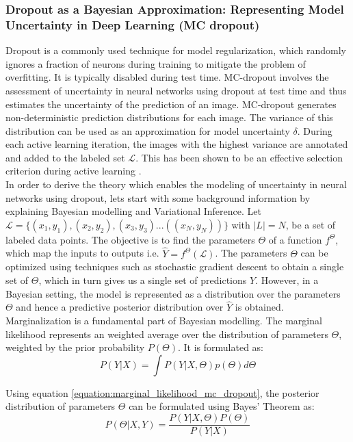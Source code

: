 \subsubsection{Dropout as a Bayesian Approximation: Representing Model Uncertainty in Deep Learning\cite{gal2016, gal2016phd} (MC dropout)}
Dropout\cite{srivastava2014} is a commonly used technique for model regularization, which randomly ignores a fraction of neurons during training to mitigate the problem of overfitting. It is typically disabled during test time. MC-dropout involves the assessment of uncertainty in neural networks using dropout at test time \cite{gal2016, gal2016phd} and thus estimates the uncertainty of the prediction of an image. MC-dropout generates non-deterministic prediction distributions for each image. The variance of this distribution can be used as an approximation for model uncertainty $\delta$. During each active learning iteration, the images with the highest variance are annotated and added to the labeled set $\mathcal{L}$. This has been shown to be an effective selection criterion during active learning \cite{gal2016}. \\
In order to derive the theory which enables the modeling of uncertainty in neural networks using dropout, lets start with some background information by explaining Bayesian modelling and Variational Inference. Let $\mathcal{L} = \{(x_1, y_1), (x_2, y_2), (x_3, y_3) ... ((x_N, y_N))\}$ with $|L| = N$, be a set of labeled data points. The objective is to find the parameters $\Theta$ of a function $f^\Theta$, which map the inputs to outputs i.e. $\hat{Y} = f^\Theta(\mathcal{L})$. The parameters $\Theta$ can be optimized using techniques such as stochastic gradient descent to obtain a single set of $\Theta$, which in turn gives us a single set of predictions $\hat{Y}$. However, in a Bayesian setting, the model is represented as a distribution over the parameters $\Theta$ and hence a predictive posterior distribution over $\hat{Y}$ is obtained. Marginalization is a fundamental part of Bayesian modelling. The marginal likelihood represents an weighted average over the distribution of parameters $\Theta$, weighted by the prior probability $P(\Theta)$. It is formulated as:
\begin{equation}
    \label{equation:marginal_likelihood_mc_dropout}
    P(Y | X) = \int P(Y | X, \Theta) p(\Theta) d\Theta
\end{equation}

Using equation \ref{equation:marginal_likelihood_mc_dropout}, the posterior distribution of parameters $\Theta$ can be formulated using Bayes' Theorem as:
\begin{equation}
    \label{equation:post_dist_theta_mc_dropout}
    P(\Theta | X, Y) = \frac{P(Y | X, \Theta) P (\Theta)}{P(Y | X)}
\end{equation}

